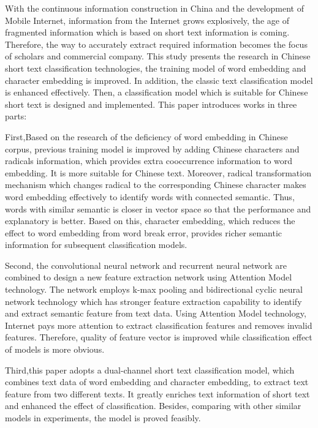 \documentclass{standalone}
\begin{document}
\begin{englishabstract}
    With the continuous information construction in China and the development of Mobile Internet, 
    information from the Internet grows explosively, 
    the age of fragmented information which is based on short text information is coming. 
    Therefore, the way to accurately extract required information becomes the focus of scholars and commercial company.
    This study presents the research in Chinese short text classification technologies, 
    the training model of word embedding and character embedding is improved. 
    In addition, the classic text classification model is enhanced effectively. 
    Then, a classification model which is suitable for Chinese short text is designed and implemented. 
    This paper introduces works in three parts:
    
    First,Based on the research of the deficiency of word embedding in Chinese corpus, 
    previous training model is improved by adding Chinese characters and radicals information, 
    which provides extra cooccurrence information to word embedding. 
    It is more suitable for Chinese text. 
    Moreover, radical transformation mechanism which changes radical 
    to the corresponding Chinese character makes word embedding effectively to identify words with connected semantic. 
    Thus, words with similar semantic is closer in vector space so that the performance and explanatory is better. 
    Based on this, character embedding, which reduces the effect to word embedding from word break error, 
    provides richer semantic information for subsequent classification models. 

    Second, the convolutional neural network and recurrent neural network 
    are combined to design a new feature extraction network 
    using Attention Model technology. 
    The network employs k-max pooling and bidirectional cyclic neural network technology which 
    has stronger feature extraction capability to identify and extract semantic feature from text data. 
    Using Attention Model technology, Internet pays more attention to extract classification features 
    and removes invalid features. 
    Therefore, quality of feature vector is improved while classification effect of models is more obvious.

    Third,this paper adopts a dual-channel short text classification model, 
    which combines text data of word embedding and character embedding, 
    to extract text feature from two different texts. 
    It greatly enriches text information of short text and enhanced the effect of classification. 
    Besides, comparing with other similar models in experiments, 
    the model is proved feasibly.

\end{englishabstract}
\end{document}
